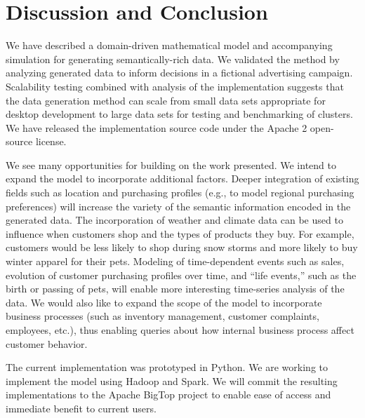 \documentclass[conference]{IEEEtran}
\begin{document}
\section{Discussion and Conclusion}
We have described a domain-driven mathematical model and accompanying simulation for generating semantically-rich data.  We validated the method by analyzing generated data to inform decisions in a fictional advertising campaign. Scalability testing combined with analysis of the implementation suggests that the data generation method can scale from small data sets appropriate for desktop development to large data sets for testing and benchmarking of clusters. We have released the implementation source code under the Apache 2 open-source license.

We see many opportunities for building on the work presented.  We intend to expand the model to incorporate additional factors.  Deeper integration of existing fields such as location and purchasing profiles (e.g., to model regional purchasing preferences) will increase the variety of the semantic information encoded in the generated data. The incorporation of weather and climate data can be used to influence when customers shop and the types of products they buy. For example, customers would be less likely to shop during snow storms and more likely to buy winter apparel for their pets. Modeling of time-dependent events such as sales, evolution of customer purchasing profiles over time, and ``life events,'' such as the birth or passing of pets, will enable more interesting time-series analysis of the data.  We would also like to expand the scope of the model to incorporate business processes (such as inventory management, customer complaints, employees, etc.), thus enabling queries about how internal business process affect customer behavior.

The current implementation was prototyped in Python.  We are working to implement the model using Hadoop and Spark.  We will commit the resulting implementations to the Apache BigTop project to enable ease of access and immediate benefit to current users. 



 
\end{document}

